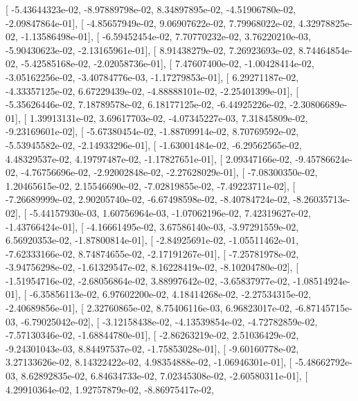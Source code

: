 \documentclass{article}
\begin{document}
       [ -5.43644323e-02,  -8.97889798e-02,   8.34897895e-02,
         -4.51906780e-02,  -2.09847864e-01],
       [ -4.85657949e-02,   9.06907622e-02,   7.79968022e-02,
          4.32978825e-02,  -1.13586498e-01],
       [ -6.59452454e-02,   7.70770232e-02,   3.76220210e-03,
         -5.90430623e-02,  -2.13165961e-01],
       [  8.91438279e-02,   7.26923693e-02,   8.74464854e-02,
         -5.42585168e-02,  -2.02058736e-01],
       [  7.47607400e-02,  -1.00428414e-02,  -3.05162256e-02,
         -3.40784776e-03,  -1.17279853e-01],
       [  6.29271187e-02,  -4.33357125e-02,   6.67229439e-02,
         -4.88888101e-02,  -2.25401399e-01],
       [ -5.35626446e-02,   7.18789578e-02,   6.18177125e-02,
         -6.44925226e-02,  -2.30806689e-01],
       [  1.39913131e-02,   3.69617703e-02,  -4.07345227e-03,
          7.31845809e-02,  -9.23169601e-02],
       [ -5.67380454e-02,  -1.88709914e-02,   8.70769592e-02,
         -5.53945582e-02,  -2.14933296e-01],
       [ -1.63001484e-02,  -6.29562565e-02,   4.48329537e-02,
          4.19797487e-02,  -1.17827651e-01],
       [  2.09347166e-02,  -9.45786624e-02,  -4.76756696e-02,
         -2.92002848e-02,  -2.27628029e-01],
       [ -7.08300350e-02,   1.20465615e-02,   2.15546690e-02,
         -7.02819855e-02,  -7.49223711e-02],
       [ -7.26689999e-02,   2.90205740e-02,  -6.67498598e-02,
         -8.40784724e-02,  -8.26035713e-02],
       [ -5.44157930e-03,   1.60756964e-03,  -1.07062196e-02,
          7.42319627e-02,  -1.43766424e-01],
       [ -4.16661495e-02,   3.67586140e-03,  -3.97291559e-02,
          6.56920353e-02,  -1.87800814e-01],
       [ -2.84925691e-02,  -1.05511462e-01,  -7.62333166e-02,
          8.74874655e-02,  -2.17191267e-01],
       [ -7.25781978e-02,  -3.94756298e-02,  -1.61329547e-02,
          8.16228419e-02,  -8.10204780e-02],
       [ -1.51954716e-02,  -2.68056864e-02,   3.88997642e-02,
         -3.65837977e-02,  -1.08514924e-01],
       [ -6.35856113e-02,   6.97602200e-02,   4.18414268e-02,
         -2.27534315e-02,  -2.40689856e-01],
       [  2.32760865e-02,   8.75406116e-03,   6.96823017e-02,
         -6.87145715e-03,  -6.79025042e-02],
       [ -3.12158438e-02,  -4.13539854e-02,  -4.72782859e-02,
         -7.57130346e-02,  -1.68844780e-01],
       [ -2.86263219e-02,   2.51036429e-02,  -9.24301043e-03,
          8.84497537e-02,  -1.75853028e-01],
       [ -9.60160778e-02,   3.27133626e-02,   8.14322422e-02,
          4.98354888e-02,  -1.06946301e-01],
       [ -5.48662792e-03,   8.62892835e-02,   6.84634733e-02,
          7.02345308e-02,  -2.60580311e-01],
       [  4.29910364e-02,   1.92757879e-02,  -8.86975417e-02,
\end{document}
